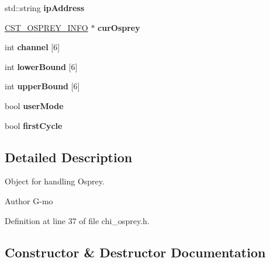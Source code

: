 \begin{DoxyCompactItemize}
\item 
\mbox{\label{class_c_h_i___o_s_p_r_e_y_aef7179a7b0f4c1f6d07d3a81c18df14f}} 
std\+::string {\bfseries ip\+Address}
\item 
\mbox{\label{class_c_h_i___o_s_p_r_e_y_a1aadac7d3240a6d8dfaef39f00a8807b}} 
\hyperlink{chi__osprey_8h_d2/d7a/struct_c_s_t___o_s_p_r_e_y___i_n_f_o}{C\+S\+T\+\_\+\+O\+S\+P\+R\+E\+Y\+\_\+\+I\+N\+FO} $\ast$ {\bfseries cur\+Osprey}
\item 
\mbox{\label{class_c_h_i___o_s_p_r_e_y_a7551a497cca8e0aaf4c7e192fb9a7e50}} 
int {\bfseries channel} \mbox{[}6\mbox{]}
\item 
\mbox{\label{class_c_h_i___o_s_p_r_e_y_a4671cf64201d511463c11e1f285a8d36}} 
int {\bfseries lower\+Bound} \mbox{[}6\mbox{]}
\item 
\mbox{\label{class_c_h_i___o_s_p_r_e_y_ae9b94c01ae05d3a4152cf023b30cc3e5}} 
int {\bfseries upper\+Bound} \mbox{[}6\mbox{]}
\item 
\mbox{\label{class_c_h_i___o_s_p_r_e_y_a20d5a98d264b3c6390b5c74732aee879}} 
bool {\bfseries user\+Mode}
\item 
\mbox{\label{class_c_h_i___o_s_p_r_e_y_a70b0ff2a6aef4ed86c32f6841e28da86}} 
bool {\bfseries first\+Cycle}
\end{DoxyCompactItemize}


\subsection{Detailed Description}
Object for handling Osprey. \begin{DoxyAuthor}{Author}
G-\/mo 
\end{DoxyAuthor}


Definition at line 37 of file chi\+\_\+osprey.\+h.



\subsection{Constructor \& Destructor Documentation}
\mbox{\label{class_c_h_i___o_s_p_r_e_y_ab53100273a3288187b5f49ee4d14f1b2_ab53100273a3288187b5f49ee4d14f1b2}} 

